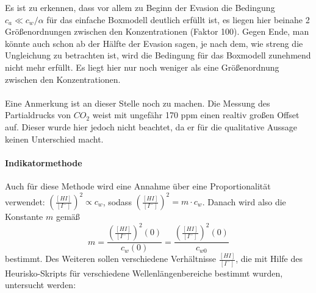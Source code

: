 \documentclass[12pt]{article}
\begin{document}
Es ist zu erkennen, dass vor allem zu Beginn der Evasion die Bedingung $c_a \ll c_w/\alpha $ für das einfache Boxmodell deutlich erfüllt ist, es liegen hier beinahe 2 Größenordnungen zwischen den Konzentrationen (Faktor 100). Gegen Ende, man könnte auch schon ab der Hälfte der Evasion sagen, je nach dem, wie streng die Ungleichung zu betrachten ist, wird die Bedingung für das Boxmodell zunehmend nicht mehr erfüllt. Es liegt hier nur noch weniger als eine Größenordnung zwischen den Konzentrationen. \\\\
Eine Anmerkung ist an dieser Stelle noch zu machen. Die Messung des Partialdrucks von $CO_2$ weist mit ungefähr 170 ppm einen realtiv großen Offset auf. Dieser wurde hier jedoch nicht beachtet, da er für die qualitative Aussage keinen Unterschied macht.

\paragraph{Indikatormethode\\}

Auch für diese Methode wird eine Annahme über eine Proportionalität verwendet: $(\frac{[HI]}{[I^-]})^2 \propto c_w $, sodass $(\frac{[HI]}{[I^-]})^2 = m \cdot c_w $. Danach wird also die Konstante $m$ gemäß
\begin{equation}
m = \frac{(\frac{[HI]}{[I^-]})^2(0)}{c_w(0)} = \frac{(\frac{[HI]}{[I^-]})^2(0)}{c_{w0}}
\end{equation}
bestimmt. Des Weiteren sollen verschiedene Verhältnisse $\frac{[HI]}{[I^-]}$, die mit Hilfe des Heurisko-Skripts für verschiedene Wellenlängenbereiche bestimmt wurden, untersucht werden:
\end{document}
